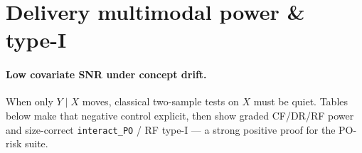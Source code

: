\section{Delivery multimodal power \& type-I}
\paragraph{Low covariate SNR under concept drift.}
When only $Y\mid X$ moves, classical two-sample tests on $X$ must be quiet.
Tables below make that negative control explicit, then show graded CF/DR/RF power
and size-correct \texttt{interact\_PO} / RF type-I --- a strong positive proof for the PO-risk suite.



